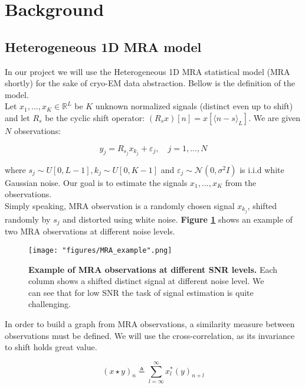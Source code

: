 \center

\section{Background}

\raggedright

\subsection{Heterogeneous 1D \acrlong{MRA} model}

In our project we will use the Heterogeneous 1D \acrlong{MRA} statistical model\cite{boumal2018heterogeneous} (\acrshort{MRA} shortly) for the sake of \acrshort{cryo-EM} data abstraction. Bellow is the definition of the model.\\
Let $x_1,...,x_K \in \mathbb{R}^L$ be $K$ unknown normalized signals (distinct even up to shift) and let $R_s$ be the cyclic shift operator: $(R_sx)[n]=x[\langle n-s \rangle_L]$. We are given $N$ observations:

\begin{equation}
y_j = R_{s_j} x_{k_j} + \varepsilon_j, \quad j=1,...,N
\end{equation}

where $s_j \sim U[0, L-1],k_j \sim U[0, K-1]$ and $\varepsilon_j \sim \mathcal{N}(0,\sigma^2I)$ is i.i.d white Gaussian noise. Our goal is to estimate the signals 
$x_1,...,x_K$ from the observations.\\
Simply speaking, \acrshort{MRA} observation is a randomly chosen signal $x_{k_j}$, shifted randomly by $s_j$ and distorted using white noise. \textbf{Figure \ref{fig:fig2}} shows an example of two \acrshort{MRA} observations at different noise levels.

\begin{figure}[h]
  \centering
  \texttt{[image: "figures/MRA\_example".png]}
  \caption{\textbf{Example of \acrshort{MRA} observations at different SNR levels.} Each column shows a shifted distinct signal at different noise level. We can see that for low \acrshort{SNR} the task of signal estimation is quite challenging.}
  \label{fig:fig2}
\end{figure}

In order to build a graph from \acrshort{MRA} observations, a similarity measure between observations must be defined. We will use the cross-correlation, as its invariance to shift holds great value.

\begin{equation}
(x \star y)_n \triangleq \sum_{l=\infty}^{\infty}x^*_l(y)_{n+l}
\end{equation}


